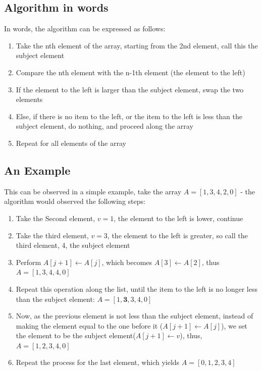 \documentclass{article}
\begin{document}
    \subsection{Algorithm in words}
        In words, the algorithm can be expressed as follows:
        \begin{enumerate}[itemsep=0mm]
            \item Take the nth element of the array, starting from the 2nd element, call this the subject element
            \item Compare the nth element with the n-1th element (the element to the left)
            \item If the element to the left is larger than the subject element, swap the two elements
            \item Else, if there is no item to the left, or the item to the left is less than the subject element, do nothing, and proceed along the array
            \item Repeat for all elements of the array
        \end{enumerate}

    \subsection{An Example}
        This can be observed in a simple example, take the array $A=[1, 3, 4, 2, 0]$ - the algorithm would observed the following steps:

        \begin{enumerate}[itemsep=0mm]
            \item Take the Second element, $v=1$, the element to the left is lower, continue
            \item Take the third element, $v=3$, the element to the left is greater, so call the third element, 4, the subject element
            \item Perform $A[j + 1] \leftarrow A[j]$, which becomes $A[3] \leftarrow A[2]$, thus $A=[1, 3, 4, 4, 0]$
            \item Repeat this operation along the list, until the item to the left is no longer less than the subject element: $A=[1, \mathbf{3}, 3, 4, 0]$
            \item Now, as the previous element is not less than the subject element, instead of making the element equal to the one before it ($A[j + 1] \leftarrow A[j]$), we set the element to be the subject element($A[j + 1] \leftarrow      v$), thus, $A=[1, 2, 3, 4, 0]$
            \item Repeat the process for the last element, which yields $A=[0, 1, 2, 3, 4]$
        \end{enumerate}
\end{document}
